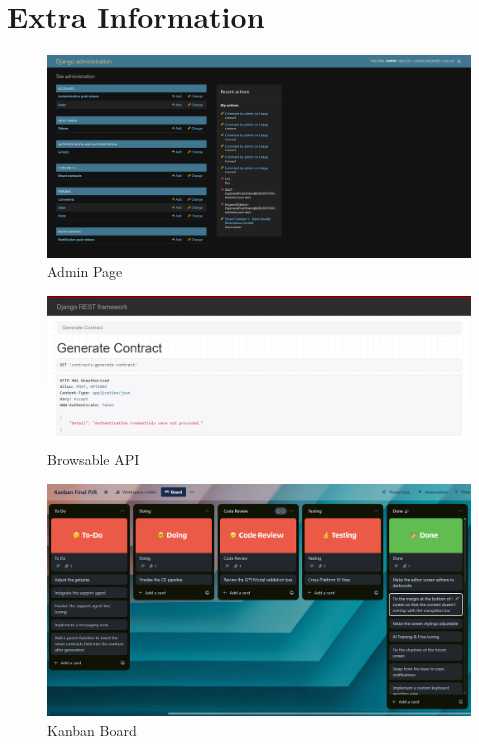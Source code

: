 \chapter{Extra Information}

\begin{figure}[!ht]
    \centering
    \includegraphics[width=0.5\linewidth]{LATEX/Appendices/Images/Software/Backend/admin_page.png}
    \caption{Admin Page}
    \label{fig:admin-page}
\end{figure}

\begin{figure}[!ht]
    \centering
    \includegraphics[width=0.5\linewidth]{LATEX/Appendices/Images/Software/Backend/browsable_API_1.png}
    \caption{Browsable API}
    \label{fig:browsable-api}
\end{figure}

\begin{figure}[!ht]
    \centering
    \includegraphics[width=0.5\linewidth]{LATEX/Appendices/Images/Software/kanban_board.png}
    \caption{Kanban Board}
    \label{fig:kanban-board}
\end{figure}